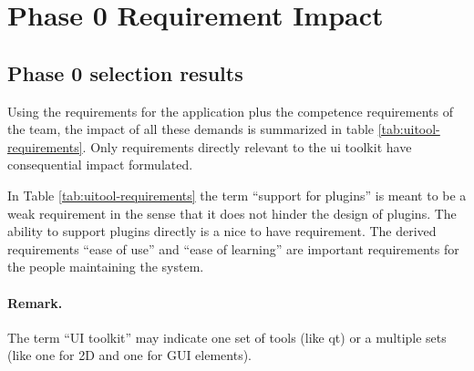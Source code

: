 \section{Phase 0 Requirement Impact}
\label{sec:requirement-impact}

\subsection{Phase 0 selection results}

Using the requirements for the application plus the competence requirements of
the team, the impact of all these demands is summarized in table
\ref{tab:uitool-requirements}. Only requirements directly relevant to the ui
toolkit have consequential impact formulated.

In Table \ref{tab:uitool-requirements} the term ``support for plugins'' is
meant to be a weak requirement in the sense that it does not hinder the design
of plugins. The ability to support plugins directly is a nice to have
requirement. The derived requirements ``ease of use'' and ``ease of learning''
are important requirements for the people maintaining the system.

\paragraph{Remark.} The term ``UI toolkit'' may indicate one set of tools (like
qt) or a multiple sets (like one for 2D and one for GUI elements).

